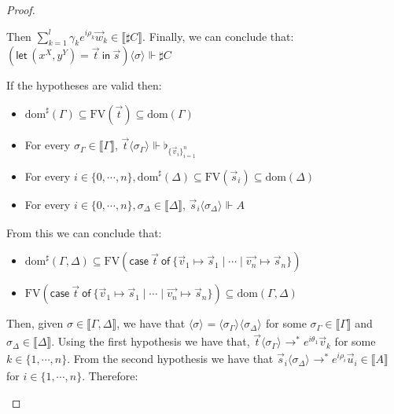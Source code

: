 \documentclass[a4paper,UKenglish,numberwithinsect,pdfa,anonymous]{lipics-v2021}
\theoremstyle{restatestyle}
\newcommand\lra{\longrightarrow}
\newcommand\ansubst[2]{\ensuremath{\langle #1 \rangle_{#2}}}
\newcommand\dom[1]{\mathrm{dom}(#1)}
\newcommand\sdom[1]{\mathrm{dom}^{\sharp}(#1)}
\newcommand\FV[1]{\mathrm{FV}(#1)}
\def\Pair#1#2{(#1,#2)} %
\def\letkeyword{\mathsf{let}}
\def\inkeyword{\mathsf{in}}
\def\LetP#1#2#3#4#5#6{\letkeyword\,\Pair{#1^{#2}}{#3^{#4}}=#5~\inkeyword~#6}
\def\gencase#1#2#3#4#5{\ensuremath{\mathsf{case}~#1~\mathsf{of}~\{#2\mapsto #4 \mid \dotsb \mid #3\mapsto #5\}}}
\def\eval{\lra^*}
\def\sem#1{\llbracket#1\rrbracket}
\def\real{\Vdash}
\newcommand\basis[1]{\ensuremath{\flat_{#1}}}
\newcommand\genbasis[3]{\ensuremath{\basis{\{#1\}_{#2}^{#3}}}}
\begin{document}
\begin{proof}
\begin{description}
    Then $\sum_{k=1}^{l}\gamma_k e^{i\rho_k} \vec{w}_{k}\in\sem{\sharp C}$. Finally, we can conclude that: $(\LetP{x}{X}{y}{Y}{\vec{t}}{\vec{s}})\ansubst{\sigma}{}\real{\sharp C}$

    \item[Case] If the hypotheses are valid then:
    \begin{itemize}
        \item $\sdom{\Gamma}\subseteq \FV{\vec{t}}\subseteq \dom{\Gamma}$
        \item For every $\sigma_\Gamma\in\sem{\Gamma}$, $\vec{t}\ansubst{\sigma_\Gamma}{}\real\genbasis{\vec{v}_{i}}{i=1}{n}$
        \item For every $i\in\{0,\dotsb ,n\}, \sdom{\Delta}\subseteq \FV{\vec{s}_{i}}\subseteq \dom{\Delta}$
        \item For every $i\in\{0,\dotsb ,n\}, \sigma_\Delta\in\sem{\Delta}$, $\vec{s}_{i}\ansubst{\sigma_\Delta}{}\real A$
    \end{itemize}

    From this we can conclude that:

    \begin{itemize}
        \item $\sdom{\Gamma,\Delta}\subseteq \FV{\gencase{\vec{t}}{\vec{v}_{1}}{\vec {v_n}}{\vec{s}_{1}}{\vec{s}_{n}}}$
        \item $\FV{\gencase{\vec{t}}{\vec{v}_{1}}{\vec {v_n}}{\vec{s}_{1}}{\vec{s}_{n}}}\subseteq \dom{\Gamma,\Delta}$
    \end{itemize}
    
    Then, given $\sigma\in\sem{\Gamma,\Delta}$, we have that $\ansubst{\sigma}{}=\ansubst{\sigma_\Gamma}{}\ansubst{\sigma_\Delta}{}$ for some $\sigma_\Gamma\in\sem{\Gamma}$ and $\sigma_\Delta\in\sem{\Delta}$. Using the first hypothesis we have that, $\vec{t}\ansubst{\sigma_\Gamma}{}\eval e^{i\theta_1}\vec{v}_{k}$ for some $k\in\{1,\dotsb ,n\}$. From the second hypothesis we have that $\vec{s}_{i}\ansubst{\sigma_\Delta}{}\eval e^{i\rho_i}\vec{u}_{i}\in\sem{A}$ for $i\in\{1,\dotsb , n\}$. Therefore:


\end{description}
\end{proof}
\end{document}
